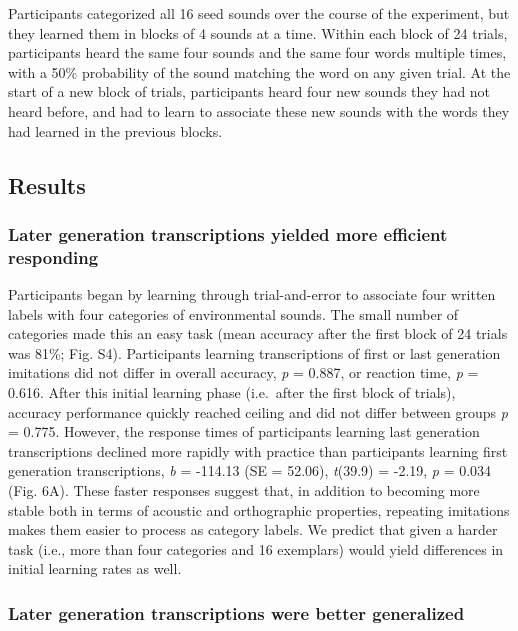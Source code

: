 \documentclass[english,floatsintext,man]{apa6}
\theoremstyle{definition}
\theoremstyle{definition}
\theoremstyle{definition}
\theoremstyle{remark}
\begin{document}
Participants categorized all 16 seed sounds over the course of the
experiment, but they learned them in blocks of 4 sounds at a time.
Within each block of 24 trials, participants heard the same four sounds
and the same four words multiple times, with a 50\% probability of the
sound matching the word on any given trial. At the start of a new block
of trials, participants heard four new sounds they had not heard before,
and had to learn to associate these new sounds with the words they had
learned in the previous blocks.

\hypertarget{results-2}{%
\subsection{Results}\label{results-2}}

\hypertarget{later-generation-transcriptions-yielded-more-efficient-responding}{%
\subsubsection{Later generation transcriptions yielded more efficient
responding}\label{later-generation-transcriptions-yielded-more-efficient-responding}}

Participants began by learning through trial-and-error to associate four
written labels with four categories of environmental sounds. The small
number of categories made this an easy task (mean accuracy after the
first block of 24 trials was 81\%; Fig. S4). Participants learning
transcriptions of first or last generation imitations did not differ in
overall accuracy, \emph{p} = 0.887, or reaction time, \emph{p} = 0.616.
After this initial learning phase (i.e.~after the first block of
trials), accuracy performance quickly reached ceiling and did not differ
between groups \emph{p} = 0.775. However, the response times of
participants learning last generation transcriptions declined more
rapidly with practice than participants learning first generation
transcriptions, \emph{b} = -114.13 (SE = 52.06), \emph{t}(39.9) = -2.19,
\emph{p} = 0.034 (Fig. 6A). These faster responses suggest that, in
addition to becoming more stable both in terms of acoustic and
orthographic properties, repeating imitations makes them easier to
process as category labels. We predict that given a harder task (i.e.,
more than four categories and 16 exemplars) would yield differences in
initial learning rates as well.

\hypertarget{later-generation-transcriptions-were-better-generalized}{%
\subsubsection{Later generation transcriptions were better
generalized}\label{later-generation-transcriptions-were-better-generalized}}
\end{document}
